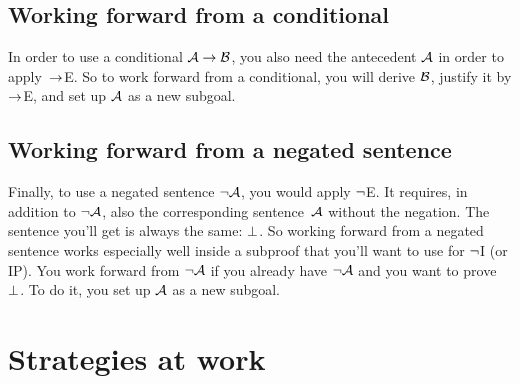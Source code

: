 \subsection*{Working forward from a conditional}

In order to use a conditional $\mathcal{A} \rightarrow \mathcal{B}$, you also need the antecedent $\mathcal{A}$ in order to apply~$\rightarrow$E. So to work forward from a conditional, you will derive $\mathcal{B}$, justify it by $\rightarrow$E, and set up $\mathcal{A}$ as a new subgoal.
\begin{fitchproof}
	\ellipsesline 
\end{fitchproof}

\subsection*{Working forward from a negated sentence}

Finally, to use a negated sentence $\neg \mathcal{A}$, you would apply $\neg$E. It requires, in addition to $\neg \mathcal{A}$, also the corresponding sentence~$\mathcal{A}$ without the negation. The sentence you'll get is always the same: $\bot$. So working forward from a negated sentence works especially well inside a subproof that you'll want to use for $\neg$I (or IP). You work forward from $\neg \mathcal{A}$ if you already have $\neg \mathcal{A}$ and you want to prove~$\bot$. To do it, you set up $\mathcal{A}$ as a new subgoal.
\begin{fitchproof}
	\ellipsesline 
\end{fitchproof}

\section{Strategies at work}

